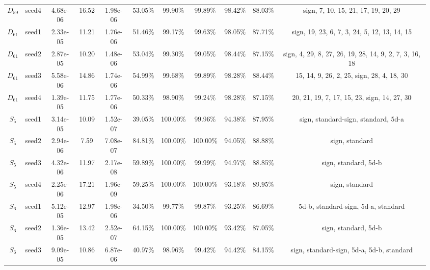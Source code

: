 \begin{tabular}{ccccccccccc}
 $D_{59}$ & seed4 &  4.68e-06 &         16.52 &        1.98e-06 &   53.05\% &   99.90\% &   99.89\% &   98.42\% & 88.03\% &                    sign, 7, 10, 15, 21, 17, 19, 20, 29 \\
 $D_{61}$ & seed1 &  2.33e-05 &         11.21 &        1.76e-06 &   51.46\% &   99.17\% &   99.63\% &   98.05\% & 87.71\% &           sign, 19, 23, 6, 7, 3, 24, 5, 12, 13, 14, 15 \\
 $D_{61}$ & seed2 &  2.87e-05 &         10.20 &        1.48e-06 &   53.04\% &   99.30\% &   99.05\% &   98.44\% & 87.15\% & sign, 4, 29, 8, 27, 26, 19, 28, 14, 9, 2, 7, 3, 16, 18 \\
 $D_{61}$ & seed3 &  5.58e-06 &         14.86 &        1.74e-06 &   54.99\% &   99.68\% &   99.89\% &   98.28\% & 88.44\% &              15, 14, 9, 26, 2, 25, sign, 28, 4, 18, 30 \\
 $D_{61}$ & seed4 &  1.39e-05 &         11.75 &        1.77e-06 &   50.33\% &   98.90\% &   99.24\% &   98.28\% & 87.15\% &            20, 21, 19, 7, 17, 15, 23, sign, 14, 27, 30 \\
  $S_{5}$ & seed1 &  3.14e-05 &         10.09 &        1.52e-07 &   39.05\% &  100.00\% &   99.96\% &   94.38\% & 87.95\% &                    sign, standard-sign, standard, 5d-a \\
  $S_{5}$ & seed2 &  2.94e-06 &          7.59 &        7.08e-07 &   84.81\% &  100.00\% &  100.00\% &   94.05\% & 88.88\% &                                         sign, standard \\
  $S_{5}$ & seed3 &  4.32e-06 &         11.97 &        2.17e-08 &   59.89\% &  100.00\% &   99.99\% &   94.97\% & 88.85\% &                                   sign, standard, 5d-b \\
  $S_{5}$ & seed4 &  2.25e-06 &         17.21 &        1.96e-09 &   59.25\% &  100.00\% &  100.00\% &   93.18\% & 89.95\% &                                         sign, standard \\
  $S_{6}$ & seed1 &  5.12e-05 &         12.97 &        1.98e-06 &   34.50\% &   99.77\% &   99.87\% &   93.25\% & 86.69\% &                    5d-b, standard-sign, 5d-a, standard \\
  $S_{6}$ & seed2 &  1.36e-05 &         13.42 &        2.52e-07 &   64.15\% &  100.00\% &  100.00\% &   93.42\% & 87.05\% &                                   sign, standard, 5d-b \\
  $S_{6}$ & seed3 &  9.09e-05 &         10.86 &        6.87e-06 &   40.97\% &   98.96\% &   99.42\% &   94.42\% & 84.15\% &              sign, standard-sign, 5d-a, 5d-b, standard \\

\end{tabular}

